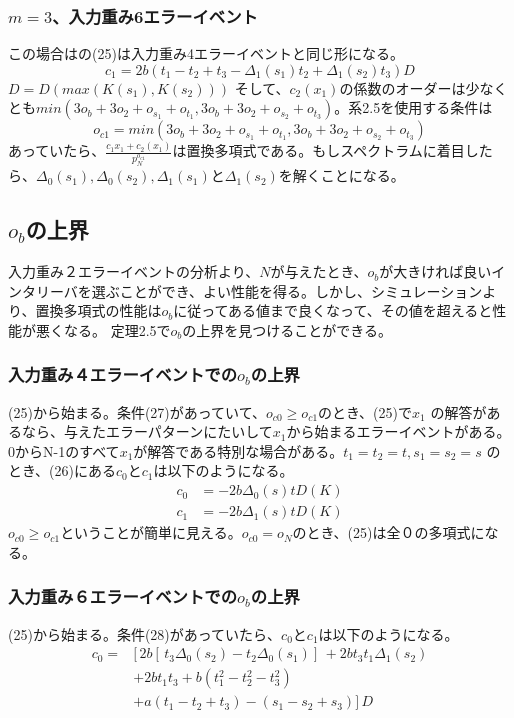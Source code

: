 \documentclass[24 pts]{article}
\begin{document}
\subsubsection{$m=3$、入力重み6エラーイベント}
この場合はの(25)は入力重み4エラーイベントと同じ形になる。
$$c_1=2b(t_1-t_2+t_3-\Delta_1(s_1)t_2+\Delta_1(s_2)t_3)D$$
$D=D(max(K(s_1),K(s_2)))$
そして、$c_2(x_1)$の係数のオーダーは少なくとも$min(3o_b+3o_2+o_{s_1}+o_{t_1},3o_b+3o_2+o_{s_2}+o_{t_3})$。系2.5を使用する条件は
\begin{equation}\tag{28}
o_{c1}=min(3o_b+3o_2+o_{s_1}+o_{t_1},3o_b+3o_2+o_{s_2}+o_{t_3})
\end{equation}
あっていたら、$\frac{c_1 x_1+c_2 (x_1 )}{p_N^{o_{c1}} }$は置換多項式である。もしスペクトラムに着目したら、$\Delta_0 (s_1 ), \Delta_0 (s_2 ), \Delta_1 (s_1 )$と$\Delta_1 (s_2 )$を解くことになる。

\subsection{$o_b$の上界}
入力重み２エラーイベントの分析より、$N$が与えたとき、$o_b$が大きければ良いインタリーバを選ぶことができ、よい性能を得る。しかし、シミュレーションより、置換多項式の性能は$o_b$に従ってある値まで良くなって、その値を超えると性能が悪くなる。
定理2.5で$o_b$の上界を見つけることができる。
\subsubsection{入力重み４エラーイベントでの$o_b$の上界}
(25)から始まる。条件(27)があっていて、$o_{c0}  \geq o_{c1}$のとき、(25)で$x_1$  の解答があるなら、与えたエラーパターンにたいして$x_1$から始まるエラーイベントがある。0からN-1のすべて$x_1$が解答である特別な場合がある。$t_1= t_2=t,s_1=s_2=s$ のとき、(26)にある$c_0$と$c_1$は以下のようになる。
\begin{equation*}
\begin{split}
c_0&=-2b\Delta_0(s)tD(K)\\
c_1&=-2b\Delta_1(s)tD(K)
\end{split}
\end{equation*}
$o_{c0}  \geq o_{c1}$ということが簡単に見える。$o_{c0}=o_N$のとき、(25)は全０の多項式になる。

\subsubsection{入力重み６エラーイベントでの$o_b$の上界}
(25)から始まる。条件(28)があっていたら、$c_0$と$c_1$は以下のようになる。
\begin{equation}\tag{30}
\begin{split}
c_0=&[\, 2b[\,t_3\Delta_0(s_2)-t_2\Delta_0(s_1)]\,+2bt_3t_1\Delta_1(s_2)\\
&+2bt_1t_3+b(t_1^2-t_2^2-t_3^2)\\
&+a(t_1-t_2+t_3)-(s_1-s_2+s_3) ]\,D
\end{split}
\end{equation}
\end{document}
